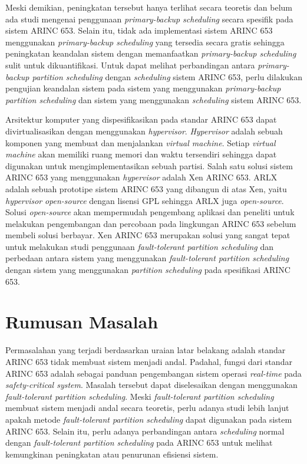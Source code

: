 Meski demikian, peningkatan tersebut hanya terlihat secara teoretis dan belum ada studi mengenai
penggunaan \textit{primary-backup scheduling} secara spesifik pada sistem ARINC 653. Selain itu,
tidak ada implementasi sistem ARINC 653 menggunakan \textit{primary-backup scheduling} yang
tersedia secara gratis sehingga peningkatan keandalan sistem dengan memanfaatkan
\textit{primary-backup scheduling} sulit untuk dikuantifikasi. Untuk dapat melihat perbandingan
antara \textit{primary-backup partition scheduling} dengan \textit{scheduling} sistem ARINC 653,
perlu dilakukan pengujian keandalan sistem pada sistem yang menggunakan \textit{primary-backup
partition scheduling} dan sistem yang menggunakan \textit{scheduling} sistem ARINC 653.

Arsitektur komputer yang dispesifikasikan pada standar ARINC 653 dapat divirtualisasikan dengan
menggunakan \textit{hypervisor}. \textit{Hypervisor} adalah sebuah komponen yang membuat dan
menjalankan \textit{virtual machine}.  Setiap \textit{virtual machine} akan memiliki ruang
memori dan waktu tersendiri sehingga dapat digunakan untuk mengimplementasikan sebuah partisi.
Salah satu solusi sistem ARINC 653 yang menggunakan \textit{hypervisor} adalah Xen ARINC 653.
ARLX adalah sebuah prototipe sistem ARINC 653 yang dibangun di atas Xen, yaitu
\textit{hypervisor} \textit{open-source} dengan lisensi GPL sehingga ARLX juga
\textit{open-source}.  Solusi \textit{open-source} akan mempermudah pengembang aplikasi dan
peneliti untuk melakukan pengembangan dan percobaan pada lingkungan ARINC 653 sebelum membeli
solusi berbayar. Xen ARINC 653 merupakan solusi yang sangat tepat untuk melakukan studi
penggunaan \textit{fault-tolerant partition scheduling} dan perbedaan antara sistem yang
menggunakan \textit{fault-tolerant partition scheduling} dengan sistem yang menggunakan
\textit{partition scheduling} pada spesifikasi ARINC 653.

\section{Rumusan Masalah}

Permasalahan yang terjadi berdasarkan uraian latar belakang adalah standar ARINC 653 tidak
membuat sistem menjadi andal. Padahal, fungsi dari standar ARINC 653 adalah sebagai panduan
pengembangan sistem operasi \textit{real-time} pada \textit{safety-critical system}.  Masalah
tersebut dapat diselesaikan dengan menggunakan \textit{fault-tolerant partition scheduling}.
Meski \textit{fault-tolerant partition scheduling} membuat sistem menjadi andal secara teoretis,
perlu adanya studi lebih lanjut apakah metode \textit{fault-tolerant partition scheduling} dapat
digunakan pada sistem ARINC 653. Selain itu, perlu adanya perbandingan antara
\textit{scheduling} normal dengan \textit{fault-tolerant partition scheduling} pada ARINC 653
untuk melihat kemungkinan peningkatan atau penurunan efisiensi sistem.

